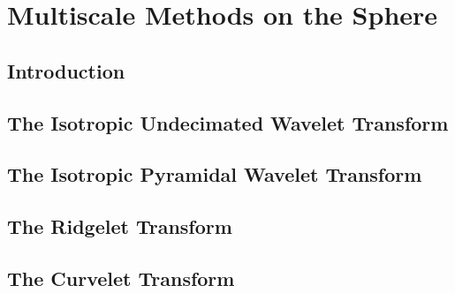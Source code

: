 

\chapter{Multiscale Methods on the Sphere}
\label{ch_mms}

\section{Introduction}
\section{The Isotropic Undecimated Wavelet Transform}
\section{The Isotropic Pyramidal Wavelet Transform}
\section{The Ridgelet Transform}
\section{The Curvelet Transform}





